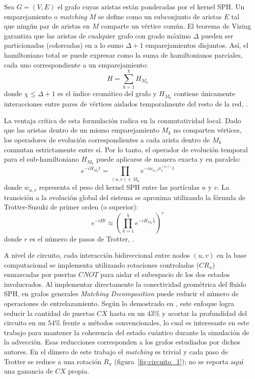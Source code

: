 Sea $G = (V, E)$ el grafo cuyas aristas están ponderadas por el kernel SPH. Un emparejamiento o \textit{matching} $M$ se define como un subconjunto de aristas $E$ tal que ningún par de aristas en $M$ comparte un vértice común. El teorema de Vizing garantiza que las aristas de cualquier grafo con grado máximo $\Delta$ pueden ser particionadas (coloreadas) en a lo sumo $\Delta + 1$ emparejamientos disjuntos. Así, el hamiltoniano total se puede expresar como la suma de hamiltonianos parciales, cada uno correspondiente a un emparejamiento:
\begin{equation}
    H = \sum_{k=1}^{\chi} H_{M_k}
\end{equation}
donde $\chi \leq \Delta + 1$ es el índice cromático del grafo y $H_{M_k}$ contiene únicamente interacciones entre pares de vértices aislados temporalmente del resto de la red, \cite{vizing1964estimate}.

La ventaja crítica de esta formulación radica en la conmutatividad local. Dado que las aristas dentro de un mismo emparejamiento $M_k$ no comparten vértices, los operadores de evolución correspondientes a cada arista dentro de $M_k$ conmutan estrictamente entre sí. Por lo tanto, el operador de evolución temporal para el sub-hamiltoniano $H_{M_k}$ puede aplicarse de manera exacta y en paralelo:
\begin{equation}
    e^{-i H_{M_k} t} = \prod_{(u,v) \in M_k} e^{-i w_{u,v} \sigma_{x}^{(u,v)} t}
\end{equation}
donde $w_{u,v}$ representa el peso del kernel SPH entre las partículas $u$ y $v$. La transición a la evolución global del sistema se aproxima utilizando la fórmula de Trotter-Suzuki de primer orden (o superior):
\begin{equation}
    e^{-i H t} \approx \left( \prod_{k=1}^{\chi} e^{-i H_{M_k} \frac{t}{r}} \right)^r
\end{equation}
donde $r$ es el número de pasos de Trotter, \cite{suzuki1976generalized}. 

A nivel de circuito, cada interacción bidireccional entre nodos $(u,v)$ en la base computacional se implementa utilizando rotaciones controladas ($CR_x$) enmarcadas por puertas $CNOT$ para aislar el subespacio de los dos estados involucrados. Al implementar directamente la conectividad geométrica del fluido SPH, en grafos generales \textit{Matching Decomposition} puede reducir el número de operaciones de entrelazamiento. Según lo demostrado en \cite{matching2026}, este enfoque logra reducir la cantidad de puertas $CX$ hasta en un $43\%$ y acortar la profundidad del circuito en un $54\%$ frente a métodos convencionales, lo cual es interesante en este trabajo para mantener la coherencia del estado cuántico durante la simulación de la advección. Esas reducciones corresponden a los grafos estudiados por dichos autores. En el dímero de este trabajo el \textit{matching} es trivial y cada paso de Trotter se reduce a una rotación $R_x$ (figura~\ref{fig:circuito_1}); no se reporta aquí una ganancia de $CX$ propia.


